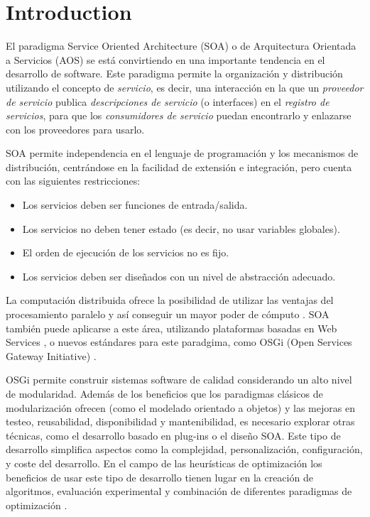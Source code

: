 \documentclass[runningheads]{llncs}
\begin{document}
\section{Introduction}

\noindent El paradigma Service Oriented Architecture (SOA) o de
Arquitectura Orientada a Servicios (AOS) \cite{PAPAZOGLOU} se está
convirtiendo en una importante tendencia en el desarrollo de
software. Este paradigma permite la organización y distribución %
utilizando el concepto de {\em servicio}, es decir, una 
interacción en la que un {\em proveedor de servicio} publica {\em
  descripciones de servicio} (o interfaces) en el {\em registro de
  servicios}, para que los {\em consumidores de servicio} puedan
encontrarlo y enlazarse con los proveedores  para usarlo. 

SOA permite independencia en el lenguaje de programación y los mecanismos de distribución, centrándose en la facilidad de extensión e integración, pero cuenta con las siguientes restricciones:

\begin{itemize}
\item Los servicios deben ser funciones de entrada/salida.
\item Los servicios no deben tener estado (es decir, no usar variables globales).
\item El orden de ejecución de los servicios no es fijo.
\item Los servicios deben ser diseñados con un nivel de abstracción adecuado. %
\end{itemize}

La computación distribuida ofrece la posibilidad de utilizar las ventajas del procesamiento paralelo y así conseguir un mayor poder de cómputo \cite{OPENSCIENCEGRID}.
SOA también puede aplicarse a este área, utilizando plataformas basadas en Web Services \cite{PAPAZOGLOU}, o nuevos estándares para este paradgima, como OSGi (Open Services Gateway Initiative) \cite{OSGI}.

OSGi permite construir sistemas software de calidad considerando un alto nivel de modularidad. Además de los beneficios que los paradigmas clásicos de modularización ofrecen (como el modelado orientado a objetos) y las mejoras en testeo, reusabilidad, disponibilidad y mantenibilidad, es necesario explorar otras técnicas, como el desarrollo basado en plug-ins o el diseño SOA. Este tipo de desarrollo simplifica aspectos como la complejidad, personalización, configuración, y coste del desarrollo. En el campo de las heurísticas de optimización los beneficios de usar este tipo de desarrollo tienen lugar en la creación de algoritmos, evaluación experimental y combinación de diferentes paradigmas de optimización \cite{PLUGINS}.
\end{document}
